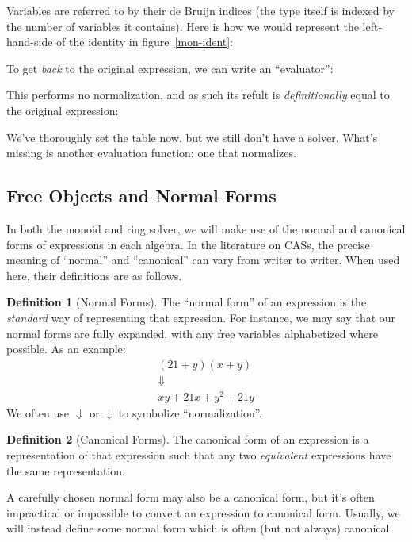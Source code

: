 \documentclass[draft, twocolumn]{article}
\theoremstyle{definition}
\newtheorem{definition}{Definition}[section]
\theoremstyle{definition}
\begin{document}
Variables are referred to by their de Bruijn indices (the type itself is indexed
by the number of variables it contains). Here is how we would represent the
left-hand-side of the identity in figure~\ref{mon-ident}:
\begin{center}
\end{center}

To get \emph{back} to the original expression, we can write an ``evaluator'':

This performs no normalization, and as such its refult is \emph{definitionally}
equal to the original expression\footnotemark:

We've thoroughly set the table now, but we still don't have a solver. What's
missing is another evaluation function: one that normalizes.
\subsection{Free Objects and Normal Forms}
In both the monoid and ring solver, we will make use of the normal and canonical
forms of expressions in each algebra. In the literature on CASs, the precise
meaning of ``normal'' and ``canonical'' can vary from writer to writer. When
used here, their definitions are as follows.
\begin{definition}[Normal Forms]
  The ``normal form'' of an expression is the \emph{standard} way of
  representing that expression. For instance, we may say that our normal forms
  are fully expanded, with any free variables alphabetized where possible. As an
  example:
  \begin{equation}
  \begin{gathered}
    (21 + y)(x + y) \\
    \Downarrow \\
    xy + 21x + y^2 + 21y
  \end{gathered}
  \end{equation}
  We often use \(\Downarrow\) or \(\downarrow\) to symbolize ``normalization''.
\end{definition}
\begin{definition}[Canonical Forms]
  The canonical form of an expression is a representation of that expression such
  that any two \emph{equivalent} expressions have the same representation.
\end{definition}
A carefully chosen normal form may also be a canonical form, but it's often
impractical or impossible to convert an expression to canonical form. Usually,
we will instead define some normal form which is often (but not always)
canonical.
\end{document}
